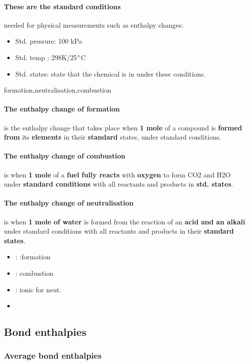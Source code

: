 \paragraph{These are the standard conditions}needed for physical measurements such as enthalpy changes:
\begin{itemize}
\item Std. pressure: 100 kPa
\item Std. temp : 298K/25$\degree$C
\item Std. states: state that the chemical is in under these conditions.
\end{itemize}
formation,neutralisation,combustion
\paragraph{The enthalpy change of formation}is the enthalpy change that takes place when \textbf{1 mole} of a compound is \textbf{formed} \textbf{from} its \textbf{elements} in their \textbf{standard} states, under standard conditions.
\paragraph{The enthalpy change of combustion}is when \textbf{1 mole} of a \textbf{fuel} \textbf{fully reacts} with \textbf{oxygen} to form CO2 and H2O under \textbf{standard conditions} with all reactants and products in \textbf{std. states}.
\paragraph{The enthalpy change of neutralisation}is when \textbf{1 mole of water} is formed from the reaction of an \textbf{acid and an alkali} under standard conditions with all reactants and products in their \textbf{standard states}.
\begin{itemize}
\item  : :formation
\item {}: combustion
\item {}: ionic for neut.
\item {}
\end{itemize}
\subsection*{Bond enthalpies}
\subsubsection*{Average bond enthalpies}
